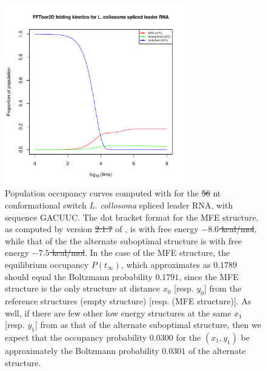 \documentclass[11pt, oneside]{Thesis} %
\providecommand{\DIFadd}[1]{{\protect\color{blue}\uwave{#1}}} %
\providecommand{\DIFdel}[1]{{\protect\color{red}\sout{#1}}}                      %
\providecommand{\DIFaddFL}[1]{\DIFadd{#1}} %
\providecommand{\DIFdelFL}[1]{\DIFdel{#1}} %
\providecommand{\DIFaddbeginFL}{} %
\providecommand{\DIFaddendFL}{} %
\providecommand{\DIFdelbeginFL}{} %
\providecommand{\DIFdelendFL}{} %
\begin{document}
\begin{figure}[!ht]
\centering
\includegraphics[width=0.7\textwidth]{Figures/Hermes/populationOccupancyCurves.pdf}
\DIFdelbeginFL %
\DIFdelendFL \DIFaddbeginFL \caption[Population occupancy curves computed with \ffteq for the
$56$ nt conformational switch {\em L. collosoma} spliced leader RNA]{\DIFaddendFL 
Population occupancy curves computed with \ffteq for the
\DIFdelbeginFL \DIFdelFL{56 }\DIFdelendFL \DIFaddbeginFL \DIFaddFL{$56$ }\DIFaddendFL nt conformational switch {\em L. collosoma} spliced leader RNA,
with sequence 
GACUUC. The dot bracket format for the MFE structure, as computed by
version \DIFdelbeginFL \DIFdelFL{2.1.7 }\DIFdelendFL \DIFaddbeginFL \DIFaddFL{$2.1.7$ }\DIFaddendFL of , is
\DIFdelbeginFL %
\DIFdelendFL \DIFaddbeginFL {} \DIFaddendFL with free
energy \DIFdelbeginFL \DIFdelFL{$-8.6$ kcal/mol}\DIFdelendFL \DIFaddbeginFL {}\DIFaddendFL , while that of the the alternate suboptimal
structure is
\DIFdelbeginFL %
\DIFdelendFL \DIFaddbeginFL {} \DIFaddendFL with free
energy \DIFdelbeginFL \DIFdelFL{$-7.5$ kcal/mol}\DIFdelendFL \DIFaddbeginFL {}\DIFaddendFL . In the case of the MFE structure, the
equilibrium occupancy $P(t_{\infty})$, which \hermes approximates
as $0.1789$ should equal the Boltzmann probability $0.1791$,
since the MFE structure is the only structure at distance $x_0$ [resp.
$y_0$] from the reference structures \strA (empty
structure) [resp. \strB (MFE structure)]. As well, if there are few
other low energy structures at the same \bpd $x_1$
[resp. $y_1$] from  as that of the alternate suboptimal
structure, then we expect that the occupancy probability $0.0300$
for the $(x_1,y_1)$ be approximately the Boltzmann probability
$0.0301$ of the alternate structure.}
\label{fig:hermes:populationOccupancySplicedLeader}
\end{figure}
\end{document}
